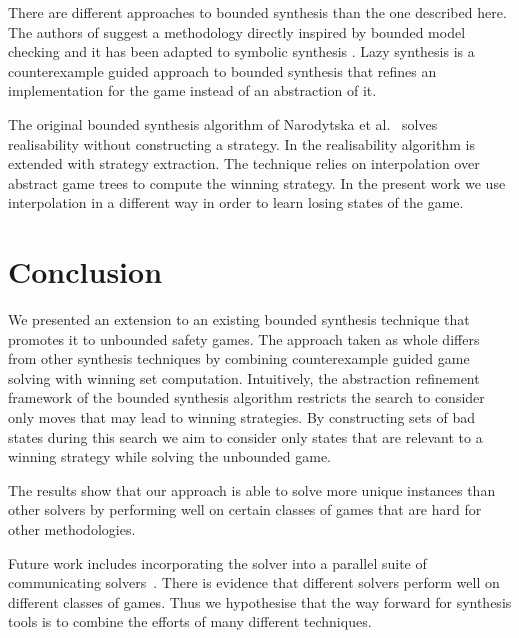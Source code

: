 \documentclass{llncs}
\begin{document}
There are different approaches to bounded synthesis than the one described
here. The authors of \cite{finkbeiner2013} suggest a methodology directly
inspired by bounded model checking and it has been adapted to symbolic
synthesis \cite{ehlers2010}. Lazy synthesis \cite{finkbeiner2012} is a
counterexample guided approach to bounded synthesis that refines an
implementation for the game instead of an abstraction of it.

The original bounded synthesis algorithm of Narodytska et
al.~\cite{narodytska2014} solves realisability without constructing a strategy.
In \cite{een2015} the realisability algorithm is extended with strategy
extraction. The technique relies on interpolation over abstract game trees to
compute the winning strategy.  In
the present work we use interpolation in a different way in order to learn
losing states of the game.

\section{Conclusion}

We presented an extension to an existing bounded synthesis technique that
promotes it to unbounded safety games. The approach taken as whole differs from
other synthesis techniques by combining counterexample guided game solving with
winning set computation. Intuitively, the abstraction refinement framework of
the bounded synthesis algorithm restricts the search to consider only moves
that may lead to winning strategies. By constructing sets of bad states during
this search we aim to consider only states that are relevant to a winning
strategy while solving the unbounded game.

The results show that our approach is able to solve more unique instances than
other solvers by performing well on certain classes of games that are hard for
other methodologies.

Future work includes incorporating the solver into a parallel suite of
communicating solvers~\cite{bloem2014}. There is evidence that different
solvers perform well on different classes of games. Thus we hypothesise that
the way forward for synthesis tools is to combine the efforts of many different
techniques.



\end{document}

